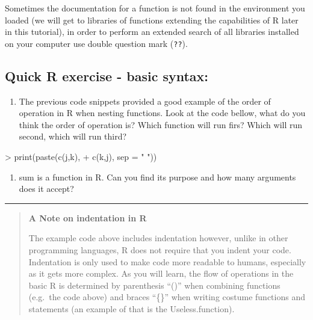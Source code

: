 \documentclass[
]{book}
\newenvironment{Shaded}{\begin{snugshade}}{\end{snugshade}}
\newcommand{\AttributeTok}[1]{\textcolor[rgb]{0.77,0.63,0.00}{#1}}
\newcommand{\FunctionTok}[1]{\textcolor[rgb]{0.00,0.00,0.00}{#1}}
\newcommand{\NormalTok}[1]{#1}
\newcommand{\SpecialCharTok}[1]{\textcolor[rgb]{0.00,0.00,0.00}{#1}}
\newcommand{\StringTok}[1]{\textcolor[rgb]{0.31,0.60,0.02}{#1}}
\providecommand{\tightlist}{%
  \setlength{\itemsep}{0pt}\setlength{\parskip}{0pt}}
\theoremstyle{definition}
\theoremstyle{definition}
\theoremstyle{definition}
\theoremstyle{definition}
\theoremstyle{remark}
\begin{document}
Sometimes the documentation for a function is not found in the environment you loaded (we will get to libraries of
functions extending the capabilities of R later in this tutorial), in order to perform an extended search of all
libraries installed on your computer use double question mark (\texttt{??}).

\hypertarget{quick-r-exercise---basic-syntax}{%
\subsection*{\texorpdfstring{\textbf{Quick R exercise - basic syntax:}}{Quick R exercise - basic syntax:}}\label{quick-r-exercise---basic-syntax}}

\begin{enumerate}
\def\labelenumi{\arabic{enumi}.}
\tightlist
\item
  The previous code snippets provided a good example of the order of operation in R when nesting functions. Look at the code bellow, what do you think the order of operation is? Which function will run firs? Which will run second, which will run third?
\end{enumerate}

\begin{Shaded}
\begin{Highlighting}[]
\SpecialCharTok{\textgreater{}} \FunctionTok{print}\NormalTok{(}\FunctionTok{paste}\NormalTok{(}\FunctionTok{c}\NormalTok{(j,k), }
\SpecialCharTok{+}             \FunctionTok{c}\NormalTok{(k,j), }\AttributeTok{sep =} \StringTok{" "}\NormalTok{))}
\end{Highlighting}
\end{Shaded}

\begin{enumerate}
\def\labelenumi{\arabic{enumi}.}
\setcounter{enumi}{1}
\tightlist
\item
  sum is a function in R. Can you find its purpose and how many arguments does it accept?
\end{enumerate}

\begin{center}\rule{0.5\linewidth}{0.5pt}\end{center}

\begin{quote}
\textbf{A Note on indentation in R}

The example code above includes indentation however, unlike in other programming languages, R does not require that you indent your code. Indentation is only used to make code more readable to humans, especially as it gets more complex. As you will learn, the flow of operations in the basic R is determined by parenthesis ``()'' when combining functions (e.g.~the code above) and braces ``\{\}'' when writing costume functions and statements (an example of that is the Useless.function).
\end{quote}
\end{document}
